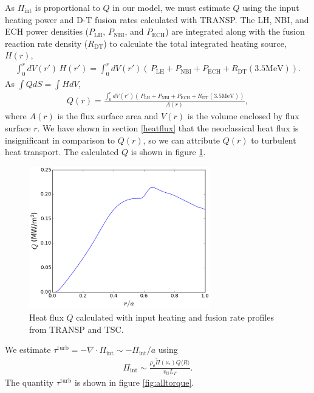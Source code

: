 \documentclass[aip, pop, preprint]{revtex4-1}
\numberwithin{figure}{section}
\numberwithin{equation}{section}
\begin{document}
As $\Pi_{\mathrm{int}}$ is proportional to $Q$ in our model, we must estimate $Q$ using the input heating power and D-T fusion rates calculated with TRANSP. The LH, NBI, and ECH power densities ($P_{\mathrm{LH}}$, $P_{\mathrm{NBI}}$, and $P_{\mathrm{ECH}}$) are integrated along with the fusion reaction rate density ($R_{\mathrm{DT}}$) to calculate the total integrated heating source, $H(r)$,
\begin{gather}
\int_0^r dV(r') \, H(r') = \int_0^r dV(r') \left(\, P_{\mathrm{LH}} + P_{\mathrm{NBI}} + P_{\mathrm{ECH}} + R_{\mathrm{DT}} (3.5 \mathrm{MeV}) \right).
\end{gather}
As $\int Q dS = \int H dV$, 
\begin{gather}
Q(r) = \frac{\int_0^{r} dV(r') \left(\, P_{\mathrm{LH}} + P_{\mathrm{NBI}} + P_{\mathrm{ECH}} + R_{\mathrm{DT}} (3.5 \mathrm{MeV}) \right)}{A(r)},
\end{gather}
where $A(r)$ is the flux surface area and $V(r)$ is the volume enclosed by flux surface $r$. We have shown in section \ref{heatflux} that the neoclassical heat flux is insignificant in comparison to $Q(r)$, so we can attribute $Q(r)$ to turbulent heat transport. The calculated $Q$ is shown in figure \ref{fig:turbHeatFlux}.

\begin{figure}[h!]
\centering
\includegraphics[width=0.7\textwidth]{figure14.eps}
\caption{\label{fig:turbHeatFlux} Heat flux $Q$ calculated with input heating and fusion rate profiles from TRANSP and TSC.}
\end{figure}

We estimate $\tau^{\mathrm{turb}} = - \nabla \cdot \Pi_{\mathrm{int}} \sim -\Pi_{\mathrm{int}}/a$ using 
\begin{gather}
\Pi_{\mathrm{int}} \sim \frac{\rho_{\theta} \widetilde{\Pi}(\nu_*) Q \langle R \rangle}{v_{ti} L_T}.
\end{gather}
The quantity $\tau^{\mathrm{turb}}$ is shown in figure \ref{fig:alltorque}.
\end{document}
